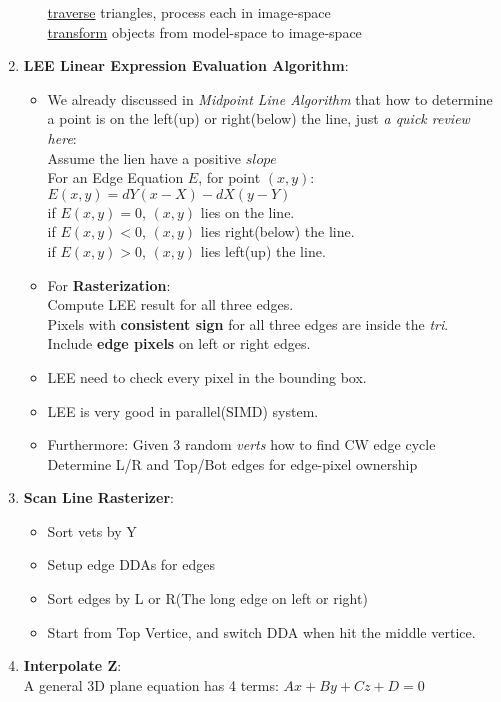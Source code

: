 \documentclass[cyan,normal,en]{elegantnote}
\begin{document}
\begin{enumerate}
\begin{itemize}
		\underline{traverse} triangles, process each in image-space\\
		\underline{transform} objects from model-space to image-space
	\end{itemize}
	\item \textbf{LEE Linear Expression Evaluation Algorithm}:
	\begin{itemize}
		\item We already discussed in \textit{Midpoint Line Algorithm} that how to determine a point is on the left(up) or right(below) the line, just \textit{a quick review here}:\\
		Assume the lien have a positive $slope$\\
		For an Edge Equation $E$, for point $(x,y)$: $E(x,y)=dY(x-X)-dX(y-Y)$\\
		if $E(x,y)=0$, $(x,y)$ lies on the line.\\
		if $E(x,y)<0$, $(x,y)$ lies right(below) the line.\\
		if $E(x,y)>0$, $(x,y)$ lies left(up) the line.
		\item For \textbf{Rasterization}:\\
		Compute LEE result for all three edges.\\
		Pixels with \textbf{consistent sign} for all three edges are inside the \textit{tri}.\\
		Include \textbf{edge pixels} on left or right edges.
		\item LEE need to check every pixel in the bounding box.
		\item LEE is very good in parallel(SIMD) system.
		\item Furthermore: Given 3 random \textit{verts} how to find CW edge cycle\\
		Determine L/R and Top/Bot edges for edge-pixel ownership
	\end{itemize}
	\item \textbf{Scan Line Rasterizer}:
	\begin{itemize}
		\item Sort vets by Y
		\item Setup edge DDAs for edges
		\item Sort edges by L or R(The long edge on left or right)
		\item Start from Top Vertice, and switch DDA when hit the middle vertice.		
	\end{itemize}
	\item \textbf{Interpolate Z}:\\
	A general 3D plane equation has 4 terms: $Ax+By+Cz+D=0$\\

\end{enumerate}
\end{document}
